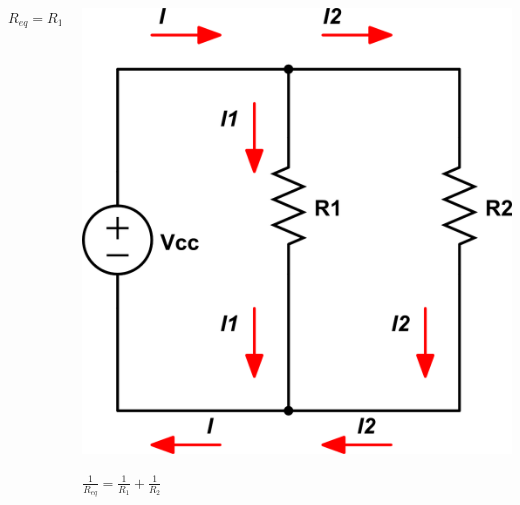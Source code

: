 \documentclass{beamer}
\begin{document}
\begin{frame}
\begin{columns}
\begin{column}{5cm}
\begin{center}
$R_{eq} = R_1+R_2+R_3$
\end{center}
\end{column}
\begin{column}{5cm}
\begin{center}
\includegraphics[scale=0.25]{fig/parallel.png}

\vspace{0.5cm}

$\frac{1}{R_{eq}} = \frac{1}{R_1}+\frac{1}{R_2}$
\end{center}
\end{column}
\end{columns}
\end{frame}
\end{document}
